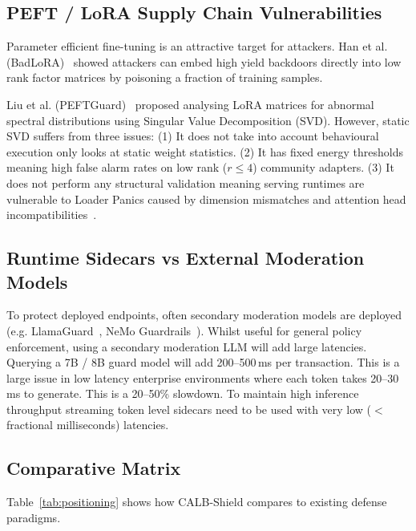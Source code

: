 \subsection{PEFT / LoRA Supply Chain Vulnerabilities}
Parameter efficient fine-tuning is an attractive target for attackers. Han et al. (BadLoRA)~\cite{han2024badlora} showed attackers can embed high yield backdoors directly into low rank factor matrices by poisoning a fraction of training samples.

Liu et al. (PEFTGuard)~\cite{liu2025peftguard} proposed analysing LoRA matrices for abnormal spectral distributions using Singular Value Decomposition (SVD). However, static SVD suffers from three issues: (1) It does not take into account behavioural execution only looks at static weight statistics. (2) It has fixed energy thresholds meaning high false alarm rates on low rank ($r \le 4$) community adapters. (3) It does not perform any structural validation meaning serving runtimes are vulnerable to Loader Panics caused by dimension mismatches and attention head incompatibilities~\cite{owasp2024cyclonedx,euaiact2024}.

\subsection{Runtime Sidecars vs External Moderation Models}
To protect deployed endpoints, often secondary moderation models are deployed (e.g. LlamaGuard~\cite{inan2023llama}, NeMo Guardrails~\cite{rebedea2023nemo}). Whilst useful for general policy enforcement, using a secondary moderation LLM will add large latencies. Querying a 7B / 8B guard model will add 200--500\,ms per transaction. This is a large issue in low latency enterprise environments where each token takes 20--30\,ms to generate. This is a 20--50\% slowdown. To maintain high inference throughput streaming token level sidecars need to be used with very low ($<$ fractional milliseconds) latencies.

\subsection{Comparative Matrix}
Table~\ref{tab:positioning} shows how CALB-Shield compares to existing defense paradigms.

